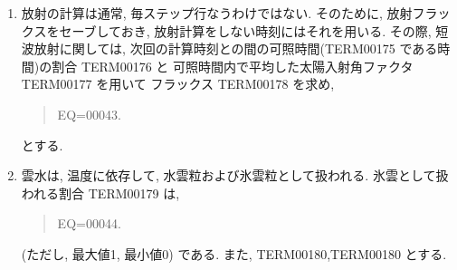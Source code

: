 \begin{enumerate}
\item 放射の計算は通常, 毎ステップ行なうわけではない.
      そのために, 放射フラックスをセーブしておき, 
      放射計算をしない時刻にはそれを用いる.
      その際, 短波放射に関しては,
      次回の計算時刻との間の可照時間(TERM00175 である時間)の割合 TERM00176 と
      可照時間内で平均した太陽入射角ファクタ TERM00177 を用いて
      フラックス TERM00178 を求め,
      \begin{quote}
EQ=00043.
\end{quote}
      とする.


\item 雲水は, 温度に依存して, 
      水雲粒および氷雲粒として扱われる.
      氷雲として扱われる割合 TERM00179 は,
      \begin{quote}
EQ=00044.
\end{quote}
      (ただし, 最大値1, 最小値0) である. また,
      TERM00180,TERM00180 とする.

\end{enumerate}




